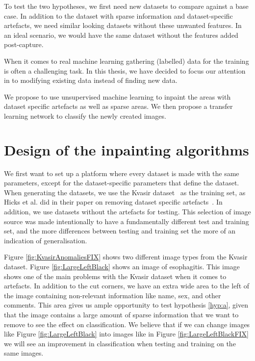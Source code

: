 To test the two hypotheses, we first need new datasets to compare against a base case. In addition to the dataset with sparse information and dataset-specific artefacts, we need similar looking datasets without these unwanted features. In an ideal scenario, we would have the same dataset without the features added post-capture. 

When it comes to real machine learning gathering (labelled) data for the training is often a challenging task. In this thesis, we have decided to focus our attention in to modifying existing data instead of finding new data. 

We propose to use unsupervised machine learning to inpaint the areas with dataset specific artefacts as well as sparse areas. We then propose a transfer learning network to classify the newly created images. 


\FloatBarrier
\section{Design of the inpainting algorithms}

We first want to set up a platform where every dataset is made with the same parameters, except for the dataset-specific parameters that define the dataset. 
When generating the datasets, we use the Kvasir dataset~\cite{Pogorelov:2017:KMI:3083187.3083212} as the training set, as Hicks et al. did in their paper on removing dataset specific artefacts~\cite{25956}. In addition, we use datasets without the artefacts for testing.
This selection of image source was made intentionally to have a fundamentally different test and training set, and the more differences between testing and training set the more of an indication of generalisation. 

Figure \ref{fig:KvasirAnomaliesFIX} shows two different image types from the Kvasir dataset. 
Figure \ref{fig:LargeLeftBlack} shows an image of esophagitis. This image shows one of the main problems with the Kvasir dataset when it comes to artefacts. In addition to the cut corners, we have an extra wide area to the left of the image containing non-relevant information like name, sex, and other comments. This area gives us ample opportunity to test hypothesis \ref{hyp:a}, given that the image contains a large amount of sparse information that we want to remove to see the effect on classification. We believe that if we can change images like Figure \ref{fig:LargeLeftBlack} into images like in Figure \ref{fig:LargeLeftBlackFIX} we will see an improvement in classification when testing and training on the same images.

